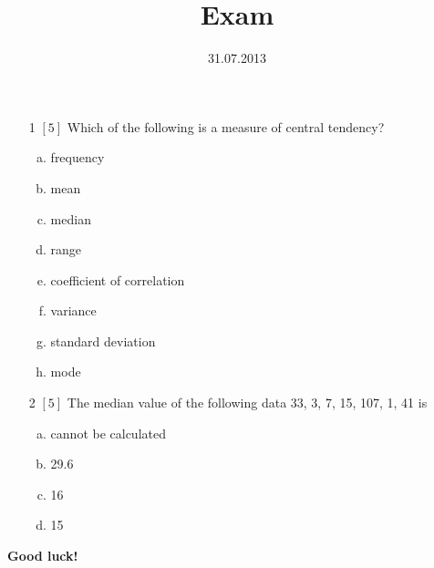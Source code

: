 \documentclass{article}
\title{Exam}
\date{31.07.2013}
\begin{document}
\maketitle{}
\begin{itemize}
\item[1] {\small $\left[5\right]$ }Which of the following is a measure of central tendency?
\begin{enumerate}[(a)]
\item frequency 
\item mean 
\item median 
\item range 
\item coefficient of correlation 
\item variance 
\item standard deviation 
\item mode 
\end{enumerate}
\item[2] {\small $\left[5\right]$ }The median value of the following data 33, 3, 7, 15, 107, 1, 41 is
\begin{enumerate}[(a)]
\item cannot be calculated 
\item 29.6 
\item 16 
\item 15 
\end{enumerate}
\end{itemize}
{\bf Good luck! }\newpage
\end{document}

